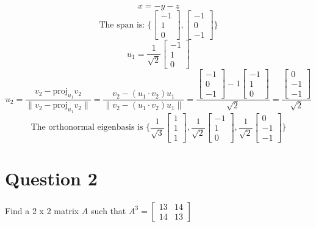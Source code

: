 \documentclass[hidelinks]{article}
\begin{document}
\[
x = -y - z
\]
\[
\text{The span is: } \{ \begin{bmatrix} -1 \\ 1 \\0 \end{bmatrix}, \begin{bmatrix} -1 \\ 0 \\ -1 \end{bmatrix}\}
\]
\[
	u_1 = \frac{1}{\sqrt{2}}\begin{bmatrix} -1 \\ 1 \\0 \end{bmatrix}
\]
\[
	u_2 =  \frac{v_2 - \text{proj}_{u_1} v_2}{\| v_2 - \text{proj}_{u_1} v_2\|} = \frac{v_2 - (u_1 \cdot v_2)u_1}{\|v_2 - (u_1 \cdot v_2)u_1\|} = \frac{\begin{bmatrix} -1 \\ 0 \\ -1 \end{bmatrix} - 1\begin{bmatrix} -1 \\ 1 \\ 0 \end{bmatrix}}{\sqrt{2}}= \frac{\begin{bmatrix} 0 \\ -1 \\ -1 \end{bmatrix}}{\sqrt{2}}
\]
\[
	\text{The orthonormal eigenbasis is } \{ \frac{1}{\sqrt{3}} \begin{bmatrix} 1 \\ 1 \\ 1 \end{bmatrix} ,\frac{1}{\sqrt{2}} \begin{bmatrix} -1 \\ 1 \\ 0 \end{bmatrix},\frac{1}{\sqrt{2}} \begin{bmatrix} 0 \\ -1 \\ -1 \end{bmatrix} \}
\]

\newpage
\section{Question 2}
Find a 2 x 2 matrix $A$ such that $A^3 = \begin{bmatrix} 13 & 14 \\ 14 & 13 \end{bmatrix}$
\end{document}
